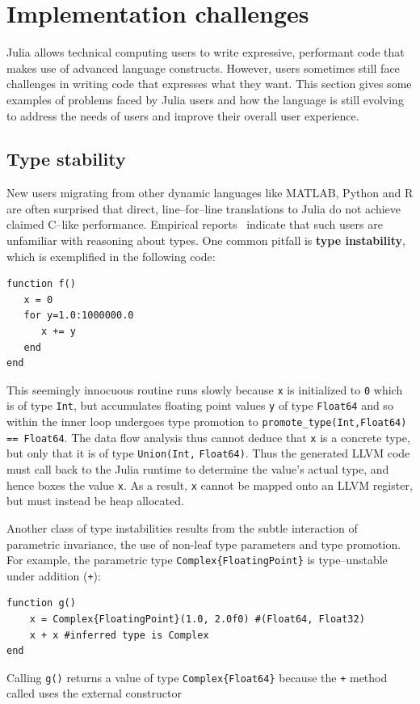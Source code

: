 \documentclass[pldi]{sigplanconf-pldi15}
\begin{document}
\section{Implementation challenges}

Julia allows technical computing users to write expressive, performant code
that makes use of advanced language constructs. However, users sometimes still
face challenges in writing code that expresses what they want. This section
gives some examples of problems faced by Julia users and how the language is
still evolving to address the needs of users and improve their overall user
experience.


\subsection{Type stability}

New users migrating from other dynamic languages like MATLAB, Python and R are
often surprised that direct, line--for--line translations to Julia do not
achieve claimed C--like performance. Empirical reports~\cite{julia-users}
indicate that such users are unfamiliar with reasoning about types. One common
pitfall is \textbf{type instability}, which is exemplified in the following
code:

\begin{lstlisting}
function f()
   x = 0
   for y=1.0:1000000.0
      x += y
   end
end
\end{lstlisting}
%
This seemingly innocuous routine runs slowly because \verb|x| is initialized to
\verb|0| which is of type \verb|Int|, but accumulates floating point values
\verb|y| of type \verb|Float64| and so within the inner loop undergoes type
promotion to \verb|promote_type(Int,Float64)| \verb|== Float64|. The data flow
analysis thus cannot deduce that \verb|x| is a concrete type, but only that it
is of type \verb|Union(Int,| \verb|Float64)|. Thus the generated LLVM code must
call back to the Julia runtime to determine the value's actual type, and hence
boxes the value \verb|x|. As a result, \verb|x| cannot be mapped onto an LLVM
register, but must instead be heap allocated.

Another class of type instabilities results from the subtle interaction of
parametric invariance, the use of non-leaf type parameters and type promotion.
For example, the parametric type \verb|Complex{FloatingPoint}| is
type--unstable under addition (\verb|+|):

\begin{lstlisting}
function g()
    x = Complex{FloatingPoint}(1.0, 2.0f0) #(Float64, Float32)
    x + x #inferred type is Complex
end
\end{lstlisting}
%
Calling \verb|g()| returns a value of type \verb|Complex{Float64}| because the
\verb|+| method called uses the external constructor
\end{document}
